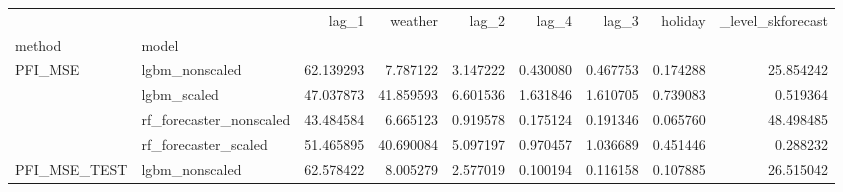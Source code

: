 \begin{table}
\centering
\begin{tabular}{llrrrrrrr}
\toprule
 &  & lag\_1 & weather & lag\_2 & lag\_4 & lag\_3 & holiday & \_level\_skforecast \\
method & model &  &  &  &  &  &  &  \\
\midrule
\multirow[c]{4}{*}{PFI\_MSE} & lgbm\_nonscaled & {\cellcolor[HTML]{B40426}} \color[HTML]{F1F1F1} 62.139293 & {\cellcolor[HTML]{6180E9}} \color[HTML]{F1F1F1} 7.787122 & {\cellcolor[HTML]{4961D2}} \color[HTML]{F1F1F1} 3.147222 & {\cellcolor[HTML]{3C4EC2}} \color[HTML]{F1F1F1} 0.430080 & {\cellcolor[HTML]{3C4EC2}} \color[HTML]{F1F1F1} 0.467753 & {\cellcolor[HTML]{3B4CC0}} \color[HTML]{F1F1F1} 0.174288 & {\cellcolor[HTML]{C5D6F2}} \color[HTML]{000000} 25.854242 \\
 & lgbm\_scaled & {\cellcolor[HTML]{B40426}} \color[HTML]{F1F1F1} 47.037873 & {\cellcolor[HTML]{D95847}} \color[HTML]{F1F1F1} 41.859593 & {\cellcolor[HTML]{6384EB}} \color[HTML]{F1F1F1} 6.601536 & {\cellcolor[HTML]{4257C9}} \color[HTML]{F1F1F1} 1.631846 & {\cellcolor[HTML]{4257C9}} \color[HTML]{F1F1F1} 1.610705 & {\cellcolor[HTML]{3C4EC2}} \color[HTML]{F1F1F1} 0.739083 & {\cellcolor[HTML]{3B4CC0}} \color[HTML]{F1F1F1} 0.519364 \\
 & rf\_forecaster\_nonscaled & {\cellcolor[HTML]{D75445}} \color[HTML]{F1F1F1} 43.484584 & {\cellcolor[HTML]{6485EC}} \color[HTML]{F1F1F1} 6.665123 & {\cellcolor[HTML]{3F53C6}} \color[HTML]{F1F1F1} 0.919578 & {\cellcolor[HTML]{3B4CC0}} \color[HTML]{F1F1F1} 0.175124 & {\cellcolor[HTML]{3B4CC0}} \color[HTML]{F1F1F1} 0.191346 & {\cellcolor[HTML]{3B4CC0}} \color[HTML]{F1F1F1} 0.065760 & {\cellcolor[HTML]{B40426}} \color[HTML]{F1F1F1} 48.498485 \\
 & rf\_forecaster\_scaled & {\cellcolor[HTML]{B40426}} \color[HTML]{F1F1F1} 51.465895 & {\cellcolor[HTML]{EF886B}} \color[HTML]{F1F1F1} 40.690084 & {\cellcolor[HTML]{5875E1}} \color[HTML]{F1F1F1} 5.097197 & {\cellcolor[HTML]{3E51C5}} \color[HTML]{F1F1F1} 0.970457 & {\cellcolor[HTML]{3E51C5}} \color[HTML]{F1F1F1} 1.036689 & {\cellcolor[HTML]{3B4CC0}} \color[HTML]{F1F1F1} 0.451446 & {\cellcolor[HTML]{3B4CC0}} \color[HTML]{F1F1F1} 0.288232 \\
\cline{1-9}
\multirow[c]{4}{*}{PFI\_MSE\_TEST} & lgbm\_nonscaled & {\cellcolor[HTML]{B40426}} \color[HTML]{F1F1F1} 62.578422 & {\cellcolor[HTML]{6282EA}} \color[HTML]{F1F1F1} 8.005279 & {\cellcolor[HTML]{465ECF}} \color[HTML]{F1F1F1} 2.577019 & {\cellcolor[HTML]{3B4CC0}} \color[HTML]{F1F1F1} 0.100194 & {\cellcolor[HTML]{3B4CC0}} \color[HTML]{F1F1F1} 0.116158 & {\cellcolor[HTML]{3B4CC0}} \color[HTML]{F1F1F1} 0.107885 & {\cellcolor[HTML]{C7D7F0}} \color[HTML]{000000} 26.515042 \\

\end{tabular}
\end{table}
